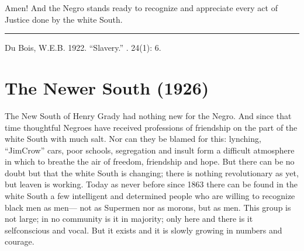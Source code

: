 \documentclass[letterpaper,10pt,english]{jupyterBook}
\begin{document}
\sphinxAtStartPar
Amen! And the Negro stands ready to recognize and appreciate every act of Justice done by the white South.


\bigskip\hrule\bigskip


\sphinxAtStartPar
{} Du Bois, W.E.B. 1922. “Slavery.” . 24(1): 6.


\section{The Newer South (1926)}
\label{\detokenize{Volumes/31/04/newer_south:the-newer-south-1926}}\label{\detokenize{Volumes/31/04/newer_south::doc}}
\sphinxAtStartPar
The New South of Henry Grady had nothing new for the Negro. And since that time thoughtful Negroes have received professions of friendship on the part of the white South with much salt. Nor can they be blamed for this: lynching, “Jim\sphinxhyphen{}Crow” cars, poor schools, segregation and insult form a difficult atmosphere in which to breathe the air of freedom, friendship and hope. But there can be no doubt but that the white South is changing; there is nothing revolutionary as yet, but leaven is working. Today as never before since 1863 there can be found in the white South a few intelligent and determined people who are willing to recognize black men as men— not as Super\sphinxhyphen{}men nor as morons, but as men. This group is not large; in no community is it in majority; only here and there is it self\sphinxhyphen{}conscious and vocal. But it exists and it is slowly growing in numbers and courage.
\end{document}
